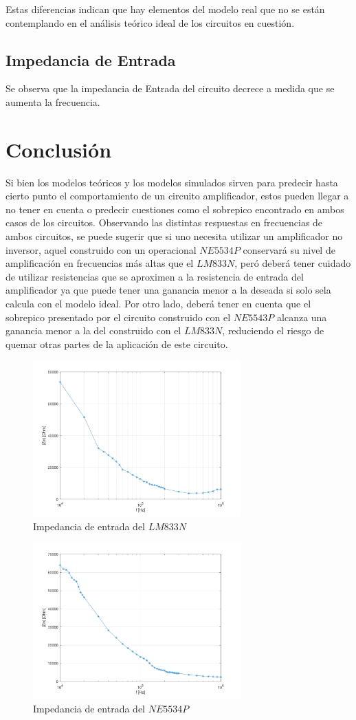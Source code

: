 Estas diferencias indican que hay elementos del modelo real que no se están contemplando en el análisis teórico ideal de los circuitos en cuestión.

\subsection{Impedancia de Entrada}
Se observa que la impedancia de Entrada del circuito decrece a medida que se aumenta la frecuencia.

\section{Conclusión}
Si bien los modelos teóricos y los modelos simulados sirven para predecir hasta cierto punto el comportamiento de un circuito amplificador, estos pueden llegar a no tener en cuenta o predecir cuestiones como el sobrepico encontrado en ambos casos de los circuitos.
Observando las distintas respuestas en frecuencias de ambos circuitos, se puede sugerir que si uno necesita utilizar un amplificador no inversor, aquel construido con un operacional $NE5534P$ conservará su nivel de amplificación en frecuencias más altas que el $LM833N$, peró deberá tener cuidado de utilizar resistencias que se aproximen a la resistencia de entrada del amplificador ya que puede tener una ganancia menor a la deseada si solo sela calcula con el modelo ideal.
Por otro lado, deberá tener en cuenta que el sobrepico presentado por el circuito construido con el $NE5543P$ alcanza una ganancia menor a la del construido con el $LM833N$, reduciendo el riesgo de quemar otras partes de la aplicación de este circuito.

\begin{figure}[h]
\begin{center}
\includegraphics[height=6cm]{../Ex2/Informe/rsc/lm_proto_zin.png}
\caption{Impedancia de entrada del $LM833N$}
\label{fig:e2_lm_proto_zin}
\end{center}
\end{figure}

\begin{figure}[h]
\begin{center}
\includegraphics[height=6cm]{../Ex2/Informe/rsc/ne_proto_zin.png}
\caption{Impedancia de entrada del $NE5534P$}
\label{fig:e2_ne_proto_zin}
\end{center}
\end{figure}